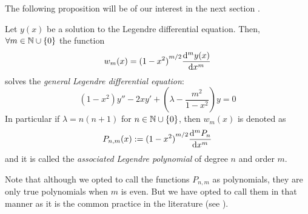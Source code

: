 \documentclass[../main.tex]{subfiles}
\begin{document}
The following proposition will be of our interest in the next section \cite{mathematical_methods}.
\begin{proposition}\label{prop:associate_legendre}
  Let $y(x)$ be a solution to the Legendre differential equation. Then, $\forall m\in\mathbb{N}\cup\{0\}$ the function
  \begin{equation}
    w_m(x)={(1-x^2)}^{m/2} \dv[m]{y(x)}{x}
  \end{equation}
  solves the \emph{general Legendre differential equation}:
  \begin{equation}
    (1-x^2)y''-2xy'+\left(\lambda - \frac{m^2}{1-x^2}\right) y=0
  \end{equation}
  In particular if $\lambda=n(n+1)$ for $n\in\mathbb{N}\cup\{0\}$, then $w_m(x)$ is denoted as
  \begin{equation}\label{eq:associated_legendre_polynomials}
    P_{n,m}(x):={(1-x^2)}^{m/2} \dv[m]{P_n}{x}
  \end{equation}
  and it is called the \emph{associated Legendre polynomial} of degree $n$ and order $m$.
\end{proposition}
Note that although we opted to call the functions $P_{n,m}$ as polynomials, they are only true polynomials when $m$ is even. But we have opted to call them in that manner as it is the common practice in the literature (see \cite{wolfram_associated_legendre_polynomials,mathematical_methods,florida:legendre}).
\end{document}
